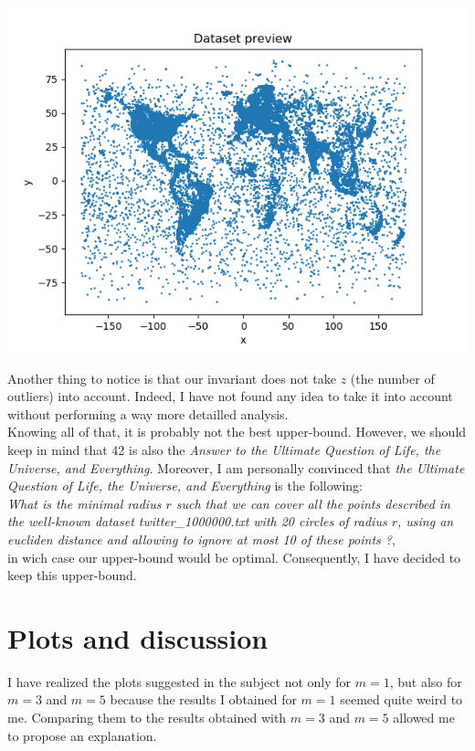 \documentclass[a4paper]{article}%
\begin{document}
	\includegraphics{dataset_preview}

	Another thing to notice is that our invariant does not take $z$ (the number of outliers) into account.
	Indeed, I have not found any idea to take it into account without performing a way more detailled analysis.\\

	Knowing all of that, it is probably not the best upper-bound.
	However, we should keep in mind that 42 is also the \textit{Answer to the Ultimate Question of Life, the Universe, and Everything}.
	Moreover, I am personally convinced that \textit{the Ultimate Question of Life, the Universe, and Everything} is the following:\\
	\textit{What is the minimal radius $r$ such that we can cover all the points described in the well-known dataset twitter\_1000000.txt with
	20 circles of radius $r$, using an eucliden distance and allowing to ignore at most 10 of these points ?},\\
	in wich case our upper-bound would be optimal.
	Consequently, I have decided to keep this upper-bound.

	\section{Plots and discussion}

	I have realized the plots suggested in the subject not only for $m=1$, but also for $m=3$ and $m=5$ because the
	results I obtained for $m=1$ seemed quite weird to me. Comparing them to the results obtained with $m=3$ and $m=5$
	allowed me to propose an explanation.\\
\end{document}
